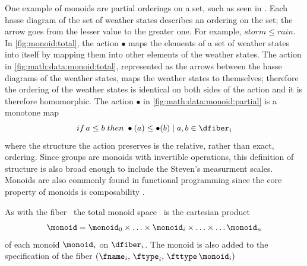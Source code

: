 \documentclass[../main.tex]{subfiles}
\begin{document}
One example of monoids are partial orderings on a set, such as seen in \label{fig:math:data:monoid}. Each hasse diagram of the set of weather states describes an ordering on the set; the arrow goes from the lesser value to the greater one. For example, $storm \leq rain$. In \autoref{fig:monoid:total}, the action $\bullet$ maps the elements of a set of weather states into itself by mapping them into other elements of the weather states. The action in  \autoref{fig:math:data:monoid:total}, represented as the arrows between the hasse diagrams of the weather states, maps the weather states to themselves; therefore the ordering of the weather states is identical on both sides of the action and it is therefore homomorphic. The action $\bullet$ in \autoref{fig:math:data:monoid:partial} is a monotone map\cite{fongInvitationAppliedCategory2019}
\begin{equation*}
    if\, a \leq b \; then \; \bullet(a) \leq \bullet(b) \mid a,b \in \dfiber_{i}
\end{equation*}
where the structure the action preserves is the relative, rather than exact, ordering. Since groups are monoids with invertible operations, this definition of structure is also broad enough to include the Steven's measurment scales\cite{stevensTheoryScalesMeasurement1946,leaFormalizationMeasurementScale}. Monoids are also commonly found in functional programming since the core property of monoids is composability \cite{yorgeyMonoidsThemeVariations}. 

As with the fiber \dfiber\, the total monoid space \monoid\ is the cartesian product
\begin{equation}
    \label{eq:math:data:monoid:decompose}
\monoid= \monoid_{0} \times \ldots \times \monoid_{i}\times \ldots \times\ldots \monoid_{n}
\end{equation}
of each monoid $\monoid_{i}$ on $\dfiber_{i}$.  The monoid is also added to the specification of the fiber $(\fname_i,\, \ftype_i,\, \fttype\, \monoid_i)$
\end{document}
